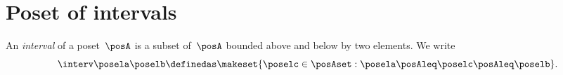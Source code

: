 
\section{Poset of intervals}
\begin{definition}[Interval]
    \label{def:interval}
    An \emph{interval} of a poset~$\posA$ is a subset of~$\posA$ bounded above and below by two elements.
    We write
    \begin{equation}
        \interv \posela \poselb
        \definedas
        \makeset{
            \poselc \in \posAset :
            \posela \posAleq \poselc \posAleq \poselb
        }.
    \end{equation}
\end{definition}

